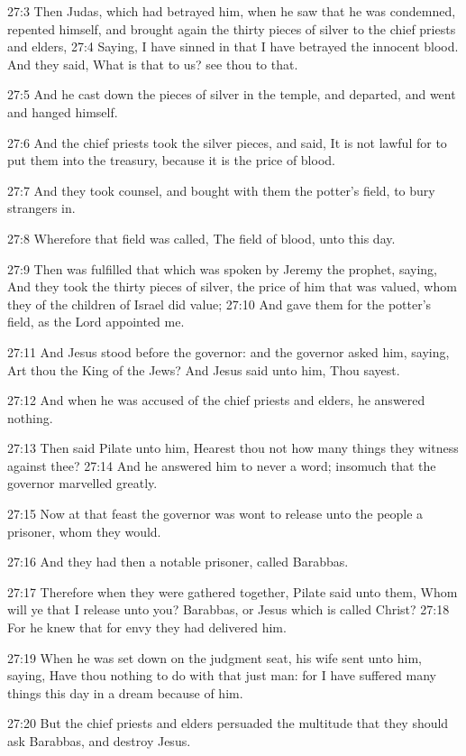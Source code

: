 27:3 Then Judas, which had betrayed him, when he saw that he was condemned, repented himself, and brought again the thirty pieces of silver to the chief priests and elders, 27:4 Saying, I have sinned in that I have betrayed the innocent blood. And they said, What is that to us? see thou to that.

27:5 And he cast down the pieces of silver in the temple, and departed, and went and hanged himself.

27:6 And the chief priests took the silver pieces, and said, It is not lawful for to put them into the treasury, because it is the price of blood.

27:7 And they took counsel, and bought with them the potter's field, to bury strangers in.

27:8 Wherefore that field was called, The field of blood, unto this day.

27:9 Then was fulfilled that which was spoken by Jeremy the prophet, saying, And they took the thirty pieces of silver, the price of him that was valued, whom they of the children of Israel did value; 27:10 And gave them for the potter's field, as the Lord appointed me.

27:11 And Jesus stood before the governor: and the governor asked him, saying, Art thou the King of the Jews? And Jesus said unto him, Thou sayest.

27:12 And when he was accused of the chief priests and elders, he answered nothing.

27:13 Then said Pilate unto him, Hearest thou not how many things they witness against thee?  27:14 And he answered him to never a word; insomuch that the governor marvelled greatly.

27:15 Now at that feast the governor was wont to release unto the people a prisoner, whom they would.

27:16 And they had then a notable prisoner, called Barabbas.

27:17 Therefore when they were gathered together, Pilate said unto them, Whom will ye that I release unto you? Barabbas, or Jesus which is called Christ?  27:18 For he knew that for envy they had delivered him.

27:19 When he was set down on the judgment seat, his wife sent unto him, saying, Have thou nothing to do with that just man: for I have suffered many things this day in a dream because of him.

27:20 But the chief priests and elders persuaded the multitude that they should ask Barabbas, and destroy Jesus.

